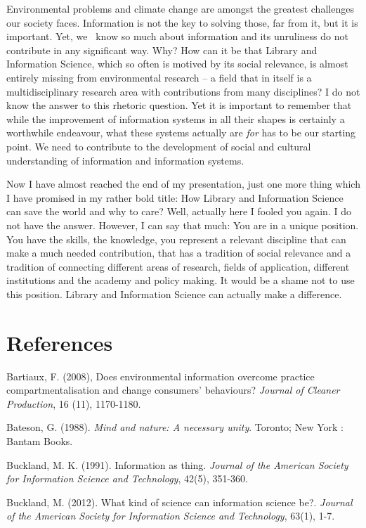 ﻿\documentclass[a4paper,
fontsize=11pt,
oneside,
numbers=noperiodatend,
parskip=half-,
bibliography=totoc,
final
]{scrartcl}
\begin{document}
Environmental problems and climate change are amongst the greatest
challenges our society faces. Information is not the key to solving
those, far from it, but it is important. Yet, we~ know so much about
information and its unruliness do not contribute in any significant way.
Why? How can it be that Library and Information Science, which so often
is motived by its social relevance, is almost entirely missing from
environmental research -- a field that in itself is a multidisciplinary
research area with contributions from many disciplines? I do not know
the answer to this rhetoric question. Yet it is important to remember
that while the improvement of information systems in all their shapes is
certainly a worthwhile endeavour, what these systems actually are
\emph{for} has to be our starting point. We need to contribute to the
development of social and cultural understanding of information and
information systems.

Now I have almost reached the end of my presentation, just one more
thing which I have promised in my rather bold title: How Library and
Information Science can save the world and why to care? Well, actually
here I fooled you again. I do not have the answer. However, I can say
that much: You are in a unique position. You have the skills, the
knowledge, you represent a relevant discipline that can make a much
needed contribution, that has a tradition of social relevance and a
tradition of connecting different areas of research, fields of
application, different institutions and the academy and policy making.
It would be a shame not to use this position. Library and Information
Science can actually make a difference.

\section*{References}\label{references}

Bartiaux, F. (2008), Does environmental information overcome practice
compartmentalisation and change consumers' behaviours? \emph{Journal of
Cleaner Production}, 16 (11), 1170-1180.

Bateson, G. (1988). \emph{Mind and nature: A necessary unity}. Toronto;
New York : Bantam Books.

Buckland, M. K. (1991). Information as thing. \emph{Journal of the
American Society for Information Science and Technology}, 42(5),
351-360.

Buckland, M. (2012). What kind of science can information science be?.
\emph{Journal of the American Society for Information Science and
Technology}, 63(1), 1-7.
\end{document}
